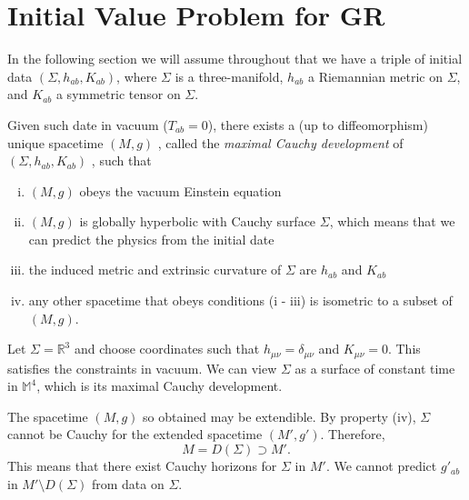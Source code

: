 
\section{Initial Value Problem for GR}%
\label{sec:initial_value_problem_for_gr}

In the following section we will assume throughout that we have a triple of initial data $(\Sigma, h_{ab}, K_{ab})$, where $\Sigma$ is a three-manifold, $h_{ab}$ a Riemannian metric on $\Sigma$, and $K_{ab}$ a symmetric tensor on $\Sigma$.

\begin{theorem}[]
  Given such date in vacuum ($T_{ab} = 0$), there exists a (up to diffeomorphism) unique spacetime $(M, g)$ , called the \emph{maximal Cauchy development} of $(\Sigma, h_{ab}, K_{ab})$ , such that
  \begin{enumerate}[i)]
    \item $(M, g)$ obeys the vacuum Einstein equation
    \item $(M, g)$ is globally hyperbolic with Cauchy surface $\Sigma$, which means that we can predict the physics from the initial date
    \item the induced metric and extrinsic curvature of $\Sigma$ are $h_{ab}$ and $K_{ab}$
    \item any other spacetime that obeys conditions (i - iii) is isometric to a subset of $(M, g)$.
  \end{enumerate} 
\end{theorem}
\begin{example}[]
  \label{ex:8-1}
  Let $\Sigma = \mathbb{R}^3$ and choose coordinates such that $h_{\mu\nu}= \delta_{\mu\nu}$ and $K_{\mu\nu} = 0$.
  This satisfies the constraints in vacuum.
  We can view $\Sigma$ as a surface of constant time in $\mathbb{M}^4$, which is its maximal Cauchy development.
\end{example}

The spacetime $(M, g)$ so obtained may be extendible.
By property (iv), $\Sigma$ cannot be Cauchy for the extended spacetime $(M', g')$.
Therefore, 
\begin{equation}
  M = D(\Sigma) \supset M'.
\end{equation}
This means that there exist Cauchy horizons for $\Sigma$ in $M'$.
We cannot predict $g'_{ab}$ in $M' \setminus D(\Sigma)$ from data on $\Sigma$.


